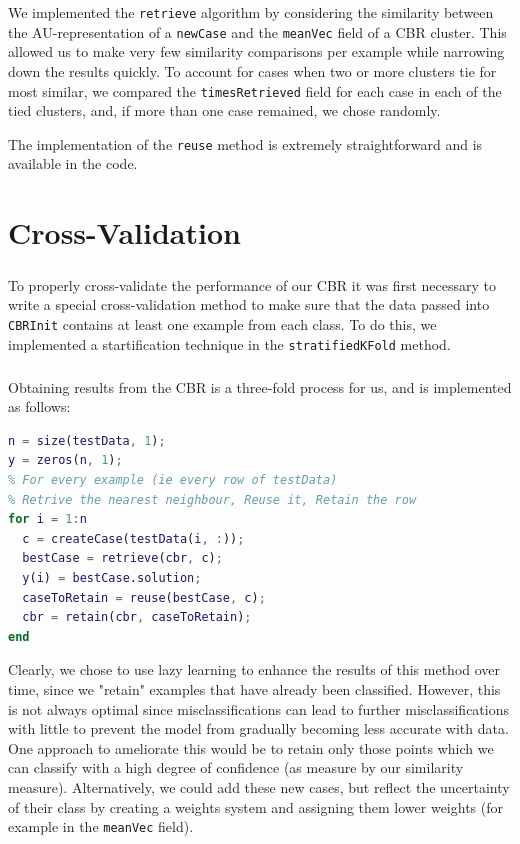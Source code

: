 \documentclass[a4paper,12pt,oneside,final]{report}
\newenvironment{changemargin}[2]{\begin{list}{}{%
\setlength{\topsep}{0pt}%
\setlength{\leftmargin}{0pt}%
\setlength{\rightmargin}{0pt}%
\setlength{\listparindent}{\parindent}%
\setlength{\itemindent}{\parindent}%
\setlength{\parsep}{0pt plus 1pt}%
\addtolength{\leftmargin}{#1}%
\addtolength{\rightmargin}{#2}%
}\item }{\end{list}}
\begin{document}
We implemented the \verb+retrieve+ algorithm by considering the similarity between the AU-representation of a \verb+newCase+ and the \verb+meanVec+ field of a CBR cluster.  This allowed us to make very few similarity comparisons per example while narrowing down the results quickly.  To account for cases when two or more clusters tie for most similar, we compared the \verb+timesRetrieved+ field for each case in each of the tied clusters, and, if more than one case remained, we chose randomly.

The implementation of the \verb+reuse+ method is extremely straightforward and is available in the code.

\chapter{Cross-Validation}
\paragraph{}
To properly cross-validate the performance of our CBR it was first necessary to write a special cross-validation method to make sure that the data passed into \verb+CBRInit+ contains at least one example from each class.  To do this, we implemented a startification technique in the \verb+stratifiedKFold+ method.  

\paragraph{}
Obtaining results from the CBR is a three-fold process for us, and is implemented as follows:
\begin{changemargin}{-5mm}{-5mm}
\begin{lstlisting}[language=Matlab, frame=single]
n = size(testData, 1);
y = zeros(n, 1);
% For every example (ie every row of testData)
% Retrive the nearest neighbour, Reuse it, Retain the row    
for i = 1:n
  c = createCase(testData(i, :));
  bestCase = retrieve(cbr, c);
  y(i) = bestCase.solution;
  caseToRetain = reuse(bestCase, c);
  cbr = retain(cbr, caseToRetain);
end
\end{lstlisting}
\end{changemargin}
Clearly, we chose to use lazy learning to enhance the results of this method over time, since we "retain" examples that have already been classified.  However, this is not always optimal since misclassifications can lead to further misclassifications with little to prevent the model from gradually becoming less accurate with data.  One approach to ameliorate this would be to retain only those points which we can classify with a high degree of confidence (as measure by our similarity measure).  Alternatively, we could add these new cases, but reflect the uncertainty of their class by creating a weights system and assigning them lower weights (for example in the \verb+meanVec+ field).
\end{document}
